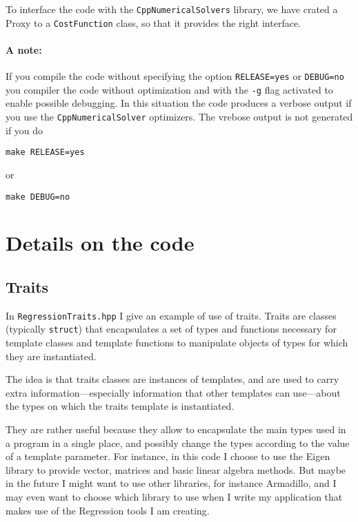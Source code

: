 \documentclass{article}
\newcommand{\li}{\lstinline}
\begin{document}
To interface the code with the \texttt{CppNumericalSolvers} library, we have crated a Proxy to a \texttt{CostFunction} class, so that it provides the right interface.

\paragraph{A note:} If you compile the code without specifying the option \texttt{RELEASE=yes} or \texttt{DEBUG=no} you compiler the code without optimization and with the \texttt{-g} flag
activated to enable possible debugging. In this situation the code produces a verbose output if you use the \texttt{CppNumericalSolver} optimizers. The vrebose output is not generated if you
do
\begin{verbatim}
make RELEASE=yes
\end{verbatim}
or
\begin{verbatim}
make DEBUG=no
\end{verbatim}
\section{Details on the code}
\subsection{Traits}
In \texttt{RegressionTraits.hpp} I give an example of use of traits.
Traits are classes (typically \li!struct!) that encapsulates a set of types and functions necessary for template classes and template functions to manipulate objects of types for which they are instantiated.

The idea is that traits classes are instances of templates, and are used to carry extra information—especially information that other templates can use—about the types on which the traits template is instantiated.

They are rather useful because they allow to encapsulate the main
types used in a program in a single place, and possibly change the
types according to the value of a template parameter. For instance, in
this code I choose to use the Eigen library to provide vector,
matrices and basic linear algebra methods. But maybe in the future I
might want to use other libraries, for instance Armadillo, and I may
even want to choose which library to use when I write my application
that makes use of the Regression tools I am creating.
\end{document}

